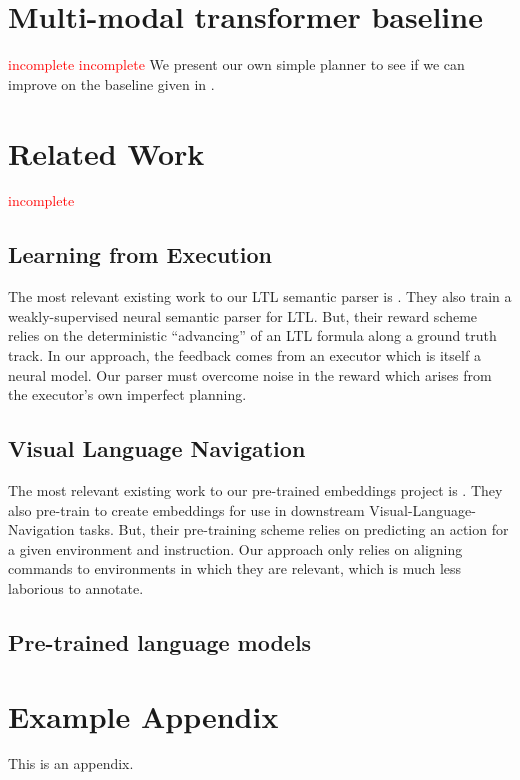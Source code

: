 \documentclass[11pt]{article}
\newcommand\todo[1]{\textcolor{red}{#1}}
\begin{document}
\section{Multi-modal transformer baseline}
\todo{incomplete}
%
\label{transformer-planner}
\todo{incomplete}
We present our own simple planner to see if we can improve on the baseline given in \cite{ruis2020benchmark}.

\section{Related Work}
\todo{incomplete}
%
\subsection{Learning from Execution}
The most relevant existing work to our LTL semantic parser is \cite{roma2019}.
%
They also train a weakly-supervised neural semantic parser for LTL.
%
But, their reward scheme relies on the deterministic ``advancing'' of an LTL formula along a ground truth track.
%
In our approach, the feedback comes from an executor which is itself a neural model.
%
Our parser must overcome noise in the reward which arises from the executor's own imperfect planning.

\subsection{Visual Language Navigation}
The most relevant existing work to our pre-trained embeddings project is \cite{Hao2020TowardsLA}.
%
They also pre-train to create embeddings for use in downstream Visual-Language-Navigation tasks.
%
But, their pre-training scheme relies on predicting an action for a given environment and instruction.
%
Our approach only relies on aligning commands to environments in which they are relevant, which is much less laborious to annotate.

\subsection{Pre-trained language models}





\appendix

\section{Example Appendix}
\label{sec:appendix}

This is an appendix.
\end{document}
